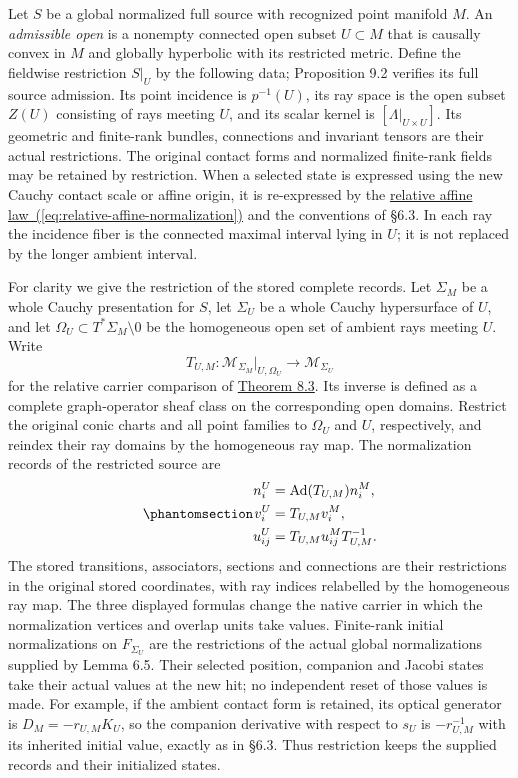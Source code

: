 \documentclass[
  english,
  11pt,
  reqno]{amsart}
\newcounter{none} %
\begin{document}
Let \(S\) be a global normalized full source with recognized point
manifold \(M\). An \emph{admissible open} is a nonempty connected open
subset \(U\subset M\) that is causally convex in \(M\) and globally
hyperbolic with its restricted metric. Define the fieldwise restriction
\(S|_U\) by the following data; Proposition 9.2 verifies its full source
admission. Its point incidence is \(p^{-1}(U)\), its ray space is the
open subset \(Z(U)\) consisting of rays meeting \(U\), and its scalar
kernel is \([\Lambda|_{U\times U}]\). Its geometric and finite-rank
bundles, connections and invariant tensors are their actual
restrictions. The original contact forms and normalized finite-rank
fields may be retained by restriction. When a selected state is
expressed using the new Cauchy contact scale or affine origin, it is
re-expressed by the \hyperref[eq:relative-affine-normalization]{relative
affine law~(\ref*{eq:relative-affine-normalization})} and the conventions of §6.3. In each ray the incidence fiber
is the connected maximal interval lying in \(U\); it is not replaced by
the longer ambient interval.

For clarity we give the restriction of the stored complete records. Let
\(\Sigma_M\) be a whole Cauchy presentation for \(S\), let \(\Sigma_U\)
be a whole Cauchy hypersurface of \(U\), and let
\(\Omega_U\subset T^*\Sigma_M\setminus0\) be the homogeneous open set of
ambient rays meeting \(U\). Write \[
T_{U,M}:\mathcal M_{\Sigma_M}|_{U,\Omega_U}
\longrightarrow\mathcal M_{\Sigma_U}
\] for the relative carrier comparison of
\hyperref[thm:relative-wave-packet-comparison]{Theorem 8.3}. Its inverse
is defined as a complete graph-operator sheaf class on the corresponding
open domains. Restrict the original conic charts and all point families
to \(\Omega_U\) and \(U\), respectively, and reindex their ray domains
by the homogeneous ray map. The normalization records of the restricted
source are
\begin{equation}\protect\phantomsection\label{eq:global-open-restriction-records}{
\begin{aligned}
n_i^U&=\operatorname{Ad}(T_{U,M})n_i^M,\\
v_i^U&=T_{U,M}v_i^M,\\
u_{ij}^U&=T_{U,M}u_{ij}^M T_{U,M}^{-1}.
\end{aligned}
}\end{equation} The stored transitions, associators, sections and
connections are their restrictions in the original stored coordinates,
with ray indices relabelled by the homogeneous ray map. The three
displayed formulas change the native carrier in which the normalization
vertices and overlap units take values. Finite-rank initial
normalizations on \(F_{\Sigma_U}\) are the restrictions of the actual
global normalizations supplied by Lemma 6.5. Their selected position,
companion and Jacobi states take their actual values at the new hit; no
independent reset of those values is made. For example, if the ambient
contact form is retained, its optical generator is \(D_M=-r_{U,M}K_U\),
so the companion derivative with respect to \(s_U\) is \(-r_{U,M}^{-1}\)
with its inherited initial value, exactly as in §6.3. Thus restriction
keeps the supplied records and their initialized states.
\end{document}
